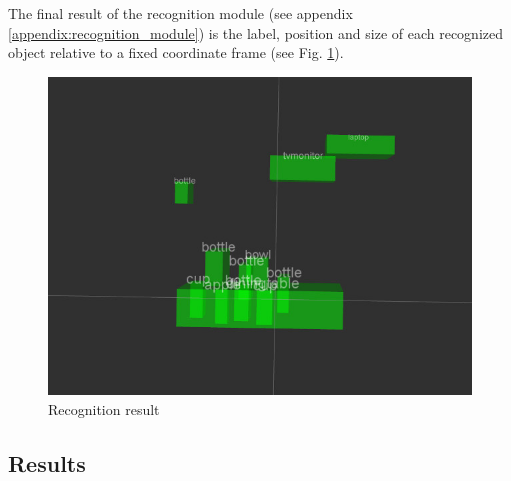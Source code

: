 \documentclass[a4paper, twocolumn]{article}
\begin{document}
    The final result of the recognition module (see appendix \ref{appendix:recognition_module}) is the label, position and size of each recognized object relative to a fixed coordinate frame (see Fig. \ref{recognition_result}).

    \begin{figure}[!b]
        \includegraphics[width=\columnwidth]{../img/recog_markers.jpg}
        \caption{Recognition result}
        \label{recognition_result}
    \end{figure}

    \subsection{Results}
\end{document}
